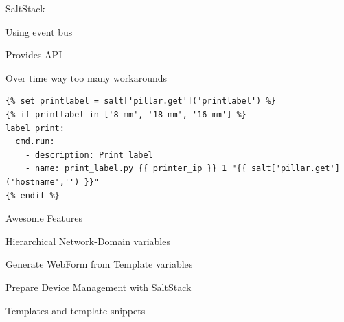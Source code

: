 \documentclass[aspectratio=169]{beamer}
\begin{document}

\begin{frame}[fragile]{SaltStack}

  \begin{vfilleditems}
    \item Using event bus
    \item Provides API
    \item Over time way too many workarounds
  \end{vfilleditems}
  \begin{verbatim}
{% set printlabel = salt['pillar.get']('printlabel') %}
{% if printlabel in ['8 mm', '18 mm', '16 mm'] %}
label_print:
  cmd.run:
    - description: Print label
    - name: print_label.py {{ printer_ip }} 1 "{{ salt['pillar.get']('hostname','') }}"
{% endif %}
          \end{verbatim}

\end{frame}


\begin{frame}{Awesome Features}
  \begin{vfilleditems}
    \item Hierarchical Network-Domain variables
    \item Generate WebForm from Template variables
    \item Prepare Device Management with SaltStack
    \item Templates and template snippets
  \end{vfilleditems}

\end{frame}
\end{document}
